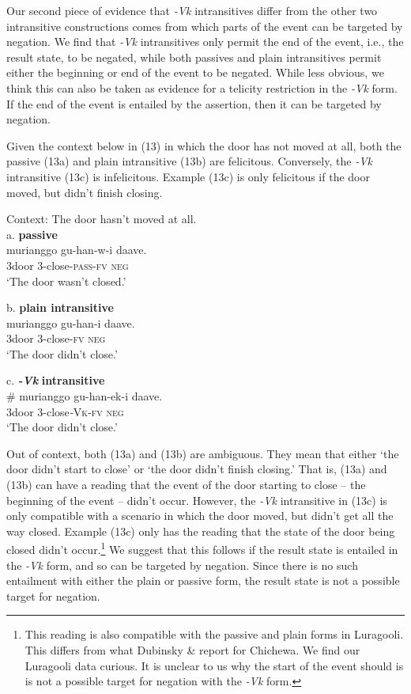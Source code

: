 \documentclass[output=paper]{langsci/langscibook}
\begin{document}
Our second piece of evidence that \textit{{}-}\textit{Vk }intransitives differ from the other two intransitive constructions comes from which parts of the event can be targeted by negation. We find that \textit{{}-Vk }intransitives only permit the end of the event, i.e., the result state, to be negated, while both passives and plain intransitives permit either the beginning or end of the event to be negated. While less obvious, we think this can also be taken as evidence for a telicity restriction in the \textit{{}-Vk} form. If the end of the event is entailed by the assertion, then it can be targeted by negation. 

Given the context below in (13) in which the door has not moved at all, both the passive (13a) and plain intransitive (13b) are felicitous. Conversely, the \textit{{}-Vk} intransitive (13c) is infelicitous. Example (13c) is only felicitous if the door moved, but didn’t finish closing.

\ea
{Context: The door hasn’t moved at all.}\\
{a. \textbf{passive}}\\
\gll   murianggo gu-han-w-i           daave.\\
       3door        3-close-\textsc{pass}{}-\textsc{fv}    \textsc{neg}\\
\glt ‘The door wasn’t closed.’
\z

\ea
{b. \textbf{plain intransitive}}\\
\gll murianggo gu-han-i     daave.\\
     \textit{  }3door         3-close-\textsc{fv}  \textsc{neg}\\
\glt ‘The door didn’t close.’
\z

\ea
{c. \textbf{\textit{{}-Vk}}\textbf{ intransitive}}\\
\gll \# murianggo gu-han-ek-i      daave.\\
     \textit{     }3door         3-close\textit{{}-}\textsc{Vk}{}-\textsc{fv}   \textsc{neg}\\
\glt ‘The door didn’t close.’
\z

Out of context, both (13a) and (13b) are ambiguous. They mean that either ‘the door didn’t start to close’ or ‘the door didn’t finish closing.’ That is, (13a) and (13b) can have a reading that the event of the door starting to close – the beginning of the event – didn’t occur. However, the \textit{{}-Vk }intransitive in (13c) is only compatible with a scenario in which the door moved, but didn’t get all the way closed. Example (13c) only has the reading that the state of the door being closed didn’t occur.\footnote{ This reading is also compatible with the passive and plain forms in Luragooli. This differs from what Dubinsky \& \citet{Simango1996} report for Chichewa. We find our Luragooli data curious. It is unclear to us why the start of the event should is is not  a possible target for negation with the \textit{{}-Vk} form. } We suggest that this follows if the result state is entailed in the \textit{{}-Vk} form, and so can be targeted by negation. Since there is no such entailment with either the plain or passive form, the result state is not a possible target for negation.
\end{document}
